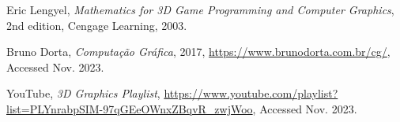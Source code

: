 \documentclass[12pt]{article}
\begin{document}
\begin{thebibliography}{9}

    Eric Lengyel,
    \textit{Mathematics for 3D Game Programming and Computer Graphics},
    2nd edition,
    Cengage Learning, 2003.

        Bruno Dorta,
        \textit{Computação Gráfica},
        2017,
        \url{https://www.brunodorta.com.br/cg/},
        Accessed Nov. 2023.

        YouTube,
        \textit{3D Graphics Playlist},
        \url{https://www.youtube.com/playlist?list=PLYnrabpSIM-97qGEeOWnxZBqvR_zwjWoo},
        Accessed Nov. 2023.
    
\end{thebibliography}
\end{document}
